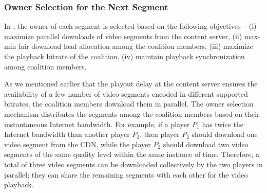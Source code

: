 %
%
%
\subsubsection{Owner Selection for the Next Segment\label{sec:nextLeadSelect}} In {\our}, the owner of each segment is selected based on the following objectives -- (i) maximize parallel downloads of video segments from the content server, (ii) max-min fair download load allocation among the coalition members, (iii) maximize the playback bitrate of the coalition, (iv) maintain playback synchronization among coalition members. 

As we mentioned earlier that the playout delay at the content server ensures the availability of a few number of video segments encoded in different supported bitrates, the coalition members download them in parallel. The owner selection mechanism distributes the segments among the coalition members based on their instantaneous Internet bandwidth. For example, if a player $P_1$ has twice the Internet bandwidth than another player $P_2$, then player $P_2$ should download one video segment from the CDN, while the player $P_2$ should download two video segments of the same quality level within the same instance of time. Therefore, a total of three video segments can be downloaded collectively by the two players in parallel; they can share the remaining segments with each other for the video playback.    

